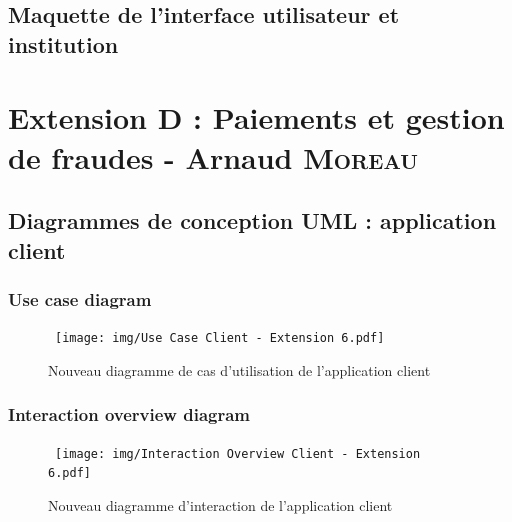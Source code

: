 \documentclass[]{report}
\begin{document}


\newpage

\section{Maquette de l'interface utilisateur et institution}



\newpage




\chapter{Extension D : Paiements et gestion de fraudes - Arnaud \textsc{Moreau}}





\newpage




\section{Diagrammes de conception UML : application client}




\subsection{Use case diagram}

\begin{figure}[h!]
\hspace{-1cm}
\hbox{
	\texttt{[image: img/Use Case Client - Extension 6.pdf]}
}
\caption{Nouveau diagramme de cas d'utilisation de l'application client}
\end{figure}



\newpage

\subsection{Interaction overview diagram}



\begin{figure}[h!]
\hspace{-3cm}
\hbox{
	\texttt{[image: img/Interaction Overview Client - Extension 6.pdf]}
}
\caption{Nouveau diagramme d'interaction de l'application client}
\end{figure}
\end{document}
